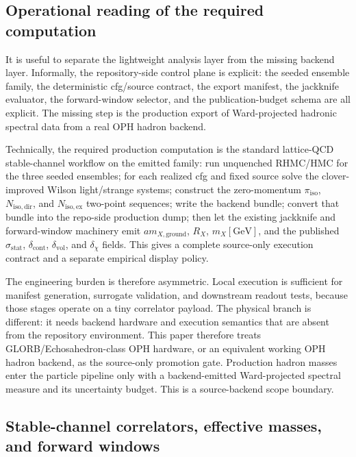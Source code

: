 \documentclass[11pt]{article}
\begin{document}
\subsection{Operational reading of the required computation}

It is useful to separate the lightweight analysis layer from the missing backend layer.
Informally, the repository-side control plane is explicit: the seeded ensemble family, the
deterministic cfg/source contract, the export manifest, the jackknife evaluator, the forward-window
selector, and the publication-budget schema are all explicit. The missing step is the production
export of Ward-projected hadronic spectral data from a real OPH hadron backend.

Technically, the required production computation is the standard lattice-QCD stable-channel
workflow on the emitted family: run unquenched RHMC/HMC for the three seeded ensembles; for each
realized cfg and fixed source solve the clover-improved Wilson light/strange systems; construct the
zero-momentum \(\pi_{\mathrm{iso}}\), \(N_{\mathrm{iso,dir}}\), and \(N_{\mathrm{iso,ex}}\)
two-point sequences; write the backend bundle; convert that bundle into the repo-side production
dump; then let the existing jackknife and forward-window machinery emit
\(a m_{X,\mathrm{ground}}\), \(R_X\), \(m_X[\mathrm{GeV}]\), and the published
\(\sigma_{\mathrm{stat}}\), \(\delta_{\mathrm{cont}}\), \(\delta_{\mathrm{vol}}\), and
\(\delta_{\chi}\) fields. This gives a complete source-only execution contract and a separate
empirical display policy.

The engineering burden is therefore asymmetric. Local execution is sufficient for manifest
generation, surrogate validation, and downstream readout tests, because those stages operate on a
tiny correlator payload. The physical branch is different: it needs backend hardware and execution
semantics that are absent from the repository environment. This paper therefore treats
GLORB/Echosahedron-class OPH hardware, or an equivalent working OPH hadron backend, as the
source-only promotion gate. Production hadron masses enter the particle pipeline only with a
backend-emitted Ward-projected spectral measure and its uncertainty budget. This is a
source-backend scope boundary.

\subsection{Stable-channel correlators, effective masses, and forward windows}
\end{document}

